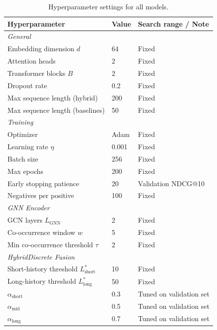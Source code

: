 \documentclass[12pt,a4paper]{report}
\begin{document}
\begin{table}[h]
\centering
\caption{Hyperparameter settings for all models.}
\label{tab:hyperparameters}
\begin{tabular}{p{5.5cm} p{2.5cm} p{4.5cm}}
\toprule
\textbf{Hyperparameter} & \textbf{Value} & \textbf{Search range / Note} \\
\midrule
\multicolumn{3}{l}{\textit{General}} \\
Embedding dimension \(d\)       & 64      & Fixed \\
Attention heads                 & 2       & Fixed \\
Transformer blocks \(B\)        & 2       & Fixed \\
Dropout rate                    & 0.2     & Fixed \\
Max sequence length (hybrid)    & 200     & Fixed \\
Max sequence length (baselines) & 50      & Fixed \\
\midrule
\multicolumn{3}{l}{\textit{Training}} \\
Optimizer                       & Adam    & Fixed \\
Learning rate \(\eta\)          & 0.001   & Fixed \\
Batch size                      & 256     & Fixed \\
Max epochs                      & 200     & Fixed \\
Early stopping patience         & 20      & Validation NDCG@10 \\
Negatives per positive          & 100     & Fixed \\
\midrule
\multicolumn{3}{l}{\textit{GNN Encoder}} \\
GCN layers \(L_{\text{GNN}}\)   & 2       & Fixed \\
Co-occurrence window \(w\)      & 5       & Fixed \\
Min co-occurrence threshold \(\tau\) & 2  & Fixed \\
\midrule
\multicolumn{3}{l}{\textit{HybridDiscrete Fusion}} \\
Short-history threshold \(L^*_{\text{short}}\) & 10 & Fixed \\
Long-history threshold \(L^*_{\text{long}}\)   & 50 & Fixed \\
\(\alpha_{\text{short}}\)       & 0.3     & Tuned on validation set \\
\(\alpha_{\text{mid}}\)         & 0.5     & Tuned on validation set \\
\(\alpha_{\text{long}}\)        & 0.7     & Tuned on validation set \\
\bottomrule
\end{tabular}
\end{table}
\end{document}
